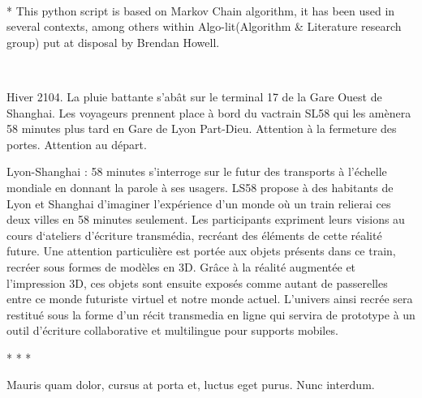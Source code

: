 ~

* This python script is based on Markov Chain algorithm, it has been
used in several contexts, among others within Algo-lit(Algorithm \&
Literature research group) put at disposal by Brendan Howell.

~


{\centering
{}
\par}

Hiver 2104. La pluie battante s{\textquoteright}ab\^at sur le terminal
17 de la Gare Ouest de Shanghai. Les\newline
voyageurs prennent place \`a bord du vactrain SL58 qui les am\`enera 58
minutes plus tard en\newline
Gare de Lyon Part-Dieu. Attention \`a la fermeture des portes. Attention
au d\'epart.

Lyon-Shanghai : 58 minutes s{\textquoteright}interroge sur le futur des
transports \`a l{\textquoteright}\'echelle mondiale en donnant la
parole \`a ses usagers. LS58 propose \`a des habitants de Lyon et
Shanghai\newline
d{\textquoteright}imaginer l{\textquoteright}exp\'erience
d{\textquoteright}un monde o\`u un train relierai ces deux villes en 58
minutes seulement.\newline
Les participants expriment leurs visions au cours
d{\textquoteleft}ateliers d{\textquoteright}\'ecriture transm\'edia,
recr\'eant des \'el\'ements de cette r\'ealit\'e future. Une attention
particuli\`ere est port\'ee aux objets pr\'esents\newline
dans ce train, recr\'eer sous formes de mod\`eles en 3D. Gr\^ace \`a la
r\'ealit\'e augment\'ee et l{\textquoteright}impression 3D, ces objets
sont ensuite expos\'es comme autant de passerelles entre ce monde
futuriste virtuel et notre monde actuel. L{\textquoteright}univers
ainsi recr\'ee sera restitu\'e sous la forme d{\textquoteright}un
r\'ecit transmedia en ligne qui servira de prototype \`a un outil
d{\textquoteright}\'ecriture collaborative et multilingue pour supports
mobiles.

{\centering
* * *
\par}

{\centering
Mauris quam dolor, cursus at porta et, luctus eget purus. Nunc interdum.
\par}

